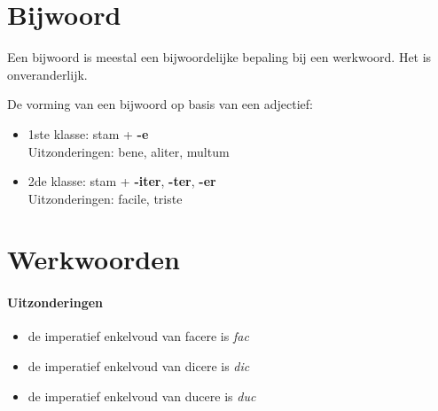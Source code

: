 \documentclass[12pt,a4paper]{article}
\begin{document}
\section{Bijwoord}

Een bijwoord is meestal een bijwoordelijke bepaling bij een werkwoord. Het is onveranderlijk.

De vorming van een bijwoord op basis van een adjectief:
\begin{itemize}
    \item 1ste klasse: stam + \textbf{-e} \\
    Uitzonderingen: bene, aliter, multum
    \item 2de klasse: stam + \textbf{-iter}, \textbf{-ter}, \textbf{-er} \\
    Uitzonderingen: facile, triste
\end{itemize}

\section{Werkwoorden}

\paragraph{Uitzonderingen}
\begin{itemize}
	\item de imperatief enkelvoud van facere is \emph{fac}
	\item de imperatief enkelvoud van dicere is \emph{dic}
	\item de imperatief enkelvoud van ducere is \emph{duc}
\end{itemize}

\newpage
\pagestyle{empty}
\end{document}
